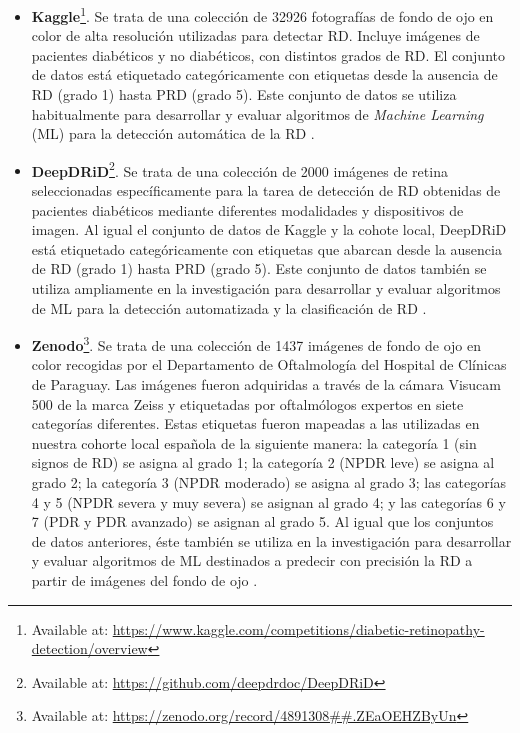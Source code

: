 \begin{itemize}[itemsep=0.25em]
    \item \textbf{Kaggle}\footnote{Available at: \url{https://www.kaggle.com/competitions/diabetic-retinopathy-detection/overview}}. Se trata de una colección de 32926 fotografías de fondo de ojo en color de alta resolución utilizadas para detectar RD. Incluye imágenes de pacientes diabéticos y no diabéticos, con distintos grados de RD. El conjunto de datos está etiquetado categóricamente con etiquetas desde la ausencia de RD (grado 1) hasta PRD (grado 5). Este conjunto de datos se utiliza habitualmente para desarrollar y evaluar algoritmos de \textit{Machine Learning} (ML) para la detección automática de la RD \cite{datos:kaggle}.
    \item \textbf{DeepDRiD}\footnote{Available at: \url{https://github.com/deepdrdoc/DeepDRiD}}. Se trata de una colección de 2000 imágenes de retina seleccionadas específicamente para la tarea de detección de RD obtenidas de pacientes diabéticos mediante diferentes modalidades y dispositivos de imagen. Al igual el conjunto de datos de Kaggle y la cohote local, DeepDRiD está etiquetado categóricamente con etiquetas que abarcan desde la ausencia de RD (grado 1) hasta PRD (grado 5). Este conjunto de datos también se utiliza ampliamente en la investigación para desarrollar y evaluar algoritmos de ML para la detección automatizada y la clasificación de RD \cite{datos:deepdrid}.
    \item \textbf{Zenodo}\footnote{Available at: \url{https://zenodo.org/record/4891308##.ZEaOEHZByUn}}. Se trata de una colección de 1437 imágenes de fondo de ojo en color recogidas por el Departamento de Oftalmología del Hospital de Clínicas de Paraguay. Las imágenes fueron adquiridas a través de la cámara Visucam 500 de la marca Zeiss y etiquetadas por oftalmólogos expertos en siete categorías diferentes. Estas etiquetas fueron mapeadas a las utilizadas en nuestra cohorte local española de la siguiente manera: la categoría 1 (sin signos de RD) se asigna al grado 1; la categoría 2 (NPDR leve) se asigna al grado 2; la categoría 3 (NPDR moderado) se asigna al grado 3; las categorías 4 y 5 (NPDR severa y muy severa) se asignan al grado 4; y las categorías 6 y 7 (PDR y PDR avanzado) se asignan al grado 5. Al igual que los conjuntos de datos anteriores, éste también se utiliza en la investigación para desarrollar y evaluar algoritmos de ML destinados a predecir con precisión la RD a partir de imágenes del fondo de ojo \cite{datos:zenodo}.
\end{itemize}

